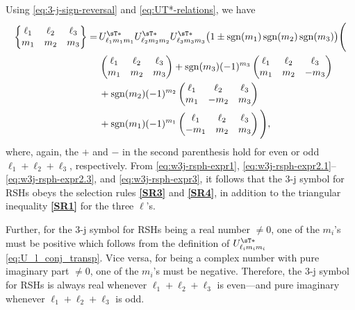 Using \eqref{eq:3-j-sign-reversal} and \eqref{eq:UT*-relations}, we have
\begin{equation}\label{eq:w3j-rsph-expr3}
\begin{aligned}
    \begin{Bmatrix}
        \ell_1 & \ell_2 & \ell_3 \\ m_1 & m_2 & m_3
    \end{Bmatrix}
    =\,&
    U^{\sT\ast}_{\ell_1 m_1m_1} U^{\sT\ast}_{\ell_2 m_2m_2} U^{\sT\ast}_{\ell_3 m_3m_3}
    \big( 1 \pm \operatorname{sgn}(m_1)\operatorname{sgn}(m_2)\operatorname{sgn}(m_3) \big)
    \Bigg( \\
    &
    \begin{pmatrix}
        \ell_1 & \ell_2 & \ell_3 \\ m_1 & m_2 & m_3
    \end{pmatrix}
    +
    \operatorname{sgn}(m_3)(-1)^{m_3}
    \begin{pmatrix}
        \ell_1 & \ell_2 & \ell_3 \\ m_1 & m_2 & -m_3
    \end{pmatrix} \\
    &
    +
    \operatorname{sgn}(m_2)(-1)^{m_2}
    \begin{pmatrix}
        \ell_1 & \ell_2 & \ell_3 \\ m_1 & -m_2 & m_3
    \end{pmatrix} \\
    &
    +
    \operatorname{sgn}(m_1)(-1)^{m_1}
    \begin{pmatrix}
        \ell_1 & \ell_2 & \ell_3 \\ -m_1 & m_2 & m_3
    \end{pmatrix}
    \Bigg)
    ,
\end{aligned}
\end{equation}
where, again, the $+$ and $-$ in the second parenthesis hold for even or odd $\ell_1 + \ell_2 + \ell_3$, respectively.
From \eqref{eq:w3j-rsph-expr1}, \eqref{eq:w3j-rsph-expr2.1}--\eqref{eq:w3j-rsph-expr2.3}, and \eqref{eq:w3j-rsph-expr3}, it follows that the 3-j symbol for RSHs obeys the selection rules \hyperlink{SR3}{\textbf{[SR3]}} and \hyperlink{SR4}{\textbf{[SR4]}}, in addition to the triangular inequality \hyperlink{SR1}{\textbf{[SR1]}} for the three $\ell$'s.

Further, for the 3-j symbol for RSHs being a real number $\neq 0$, one of the $m_i$'s must be positive which follows from the definition of $U^{\sT\ast}_{\ell_i m_im_i}$ \eqref{eq:U_l_conj_transp}.
Vice versa, for being a complex number with pure imaginary part $\neq 0$, one of the $m_i$'s must be negative.
Therefore, the 3-j symbol for RSHs is always real whenever $\ell_1 + \ell_2 + \ell_3$ is even---and pure imaginary whenever $\ell_1 + \ell_2 + \ell_3$ is odd.

